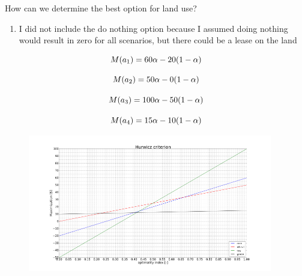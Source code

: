 \documentclass[aspectratio=1610,pdftex,dvipsnames,compress,xcolor={dvipsnames}]{beamer}
\begin{document}
\begin{frame}{How can we determine the best option for land use?}
    \begin{enumerate}[series=outerlist,topsep=0pt,itemsep=1pt,leftmargin=*,label=(\arabic*)]
        \item[]I did not include the do nothing option because I assumed doing nothing would result in zero for all scenarios, but there could be a lease on the land
    \end{enumerate}

    \begin{equation}
        \LARGE
        M(a_1)=60 \alpha-20(1-\alpha)
    \end{equation}

    \begin{equation}
        \LARGE
        M(a_2)=50 \alpha-0(1-\alpha)
    \end{equation}

    \begin{equation}
        \LARGE
        M(a_3)=100 \alpha-50(1-\alpha)
    \end{equation}

    \begin{equation}
        \LARGE
        M(a_4)=15 \alpha-10(1-\alpha)
    \end{equation}
\end{frame}


\begin{frame}{}
    \begin{figure}
        \centering
        \includegraphics[width=0.95\textwidth]{land.use.hurwicz.jpg}
    \end{figure}
\end{frame}
\end{document}
